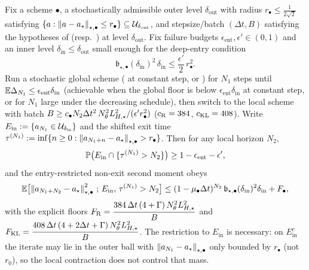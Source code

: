 \begin{corollary}
\label{cor:stoch-three-stage}
Fix a scheme $\bullet$, a stochastically admissible outer level $\delta_{\mathrm{out}}$ with radius
$r_\bullet\leq\tfrac1{2\sqrt2}$ satisfying $\{a:\left\lVert a-a_\star\right\rVert_{\star,\bullet}\leq r_\bullet\}\subseteq\mathcal{U}_{\delta_{\mathrm{out}}}$,
and stepsize/batch $(\Delta t,B)$ satisfying the hypotheses of  (resp.\
) at level $\delta_{\mathrm{out}}$. Fix failure budgets
$\epsilon_{\mathrm{ent}},\epsilon'\in(0,1)$ and an inner level $\delta_{\mathrm{in}}\leq\delta_{\mathrm{out}}$
small enough for the deep-entry condition
\[
    \mathfrak b_{\star,\bullet}(\delta_{\mathrm{in}})^2\,\delta_{\mathrm{in}}
    \leq\frac{\epsilon'}2\,r_\bullet^2 .
\]
Run a stochastic global scheme (
at constant step, or \Cref{thm:decreasing}) for $N_1$ steps until $\mathbb{E}\Delta_{N_1}\leq\epsilon_{\mathrm{ent}}\delta_{\mathrm{in}}$
(achievable when the global floor is below $\epsilon_{\mathrm{ent}}\delta_{\mathrm{in}}$ at constant step,
or for $N_1$ large under the decreasing schedule), then switch to the local scheme with batch
$B\geq c_\bullet N_2\Delta t^2\,N_\theta^2L_{H,\star}^2/(\epsilon'r_\bullet^2)$ ($c_{\mathrm{R}}=384$,
$c_{\mathrm{KL}}=408$). Write $E_{\mathrm{in}}:=\{a_{N_1}\in\mathcal{U}_{\delta_{\mathrm{in}}}\}$ and the shifted exit
time $\tau^{(N_1)}:=\inf\{n\geq0:\left\lVert a_{N_1+n}-a_\star\right\rVert_{\star,\bullet}>r_\bullet\}$. Then for any local
horizon $N_2$,
\[
    \mathbb{P}\bigl(E_{\mathrm{in}}\cap\{\tau^{(N_1)}>N_2\}\bigr)\geq 1-\epsilon_{\mathrm{ent}}-\epsilon',
\]
and the entry-restricted non-exit second moment obeys
\[
    \mathbb{E}\bigl[\left\lVert a_{N_1+N_2}-a_\star\right\rVert_{\star,\bullet}^2\,;\,E_{\mathrm{in}},\,\tau^{(N_1)}>N_2\bigr]
    \leq(1-\mu_\bullet\Delta t)^{N_2}\,\mathfrak b_{\star,\bullet}(\delta_{\mathrm{in}})^2\delta_{\mathrm{in}}
    +F_\bullet,
\]
with the explicit floors
$F_{\mathrm{R}}=\dfrac{384\,\Delta t\,(4+\Gamma)\,N_\theta^2L_{H,\star}^2}{B}$ and
$F_{\mathrm{KL}}=\dfrac{408\,\Delta t\,(4+2\Delta t+\Gamma)\,N_\theta^2L_{H,\star}^2}{B}$. The restriction to
$E_{\mathrm{in}}$ is necessary: on $E_{\mathrm{in}}^c$ the iterate may lie in the outer ball with
$\left\lVert a_{N_1}-a_\star\right\rVert_{\star,\bullet}$ only bounded by $r_\bullet$ (not $r_0$), so the local
contraction does not control that mass.
\end{corollary}

